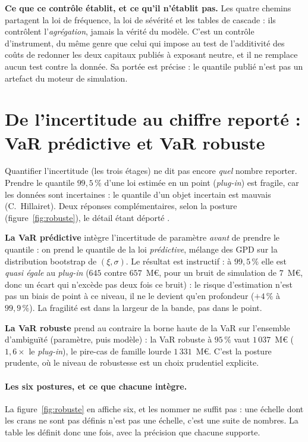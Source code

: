 \begin{cle}
\textbf{Ce que ce contrôle établit, et ce qu'il n'établit pas.} Les quatre chemins partagent la
loi de fréquence, la loi de sévérité et les tables de cascade : ils contrôlent
l'\emph{agrégation}, jamais la vérité du modèle. C'est un contrôle d'instrument, du même genre
que celui qui impose au test de l'additivité des coûts de redonner les deux capitaux publiés à
exposant neutre, et il ne remplace aucun test contre la donnée. Sa portée est précise : le
quantile publié n'est pas un artefact du moteur de simulation.
\end{cle}


\section{De l'incertitude au chiffre reporté : VaR prédictive et VaR robuste}
\label{sec:predictive-robuste}

Quantifier l'incertitude (les trois étages) ne dit pas encore \emph{quel} nombre reporter.
Prendre le quantile $99{,}5\,\%$ d'une loi estimée en un point (\emph{plug-in}) est fragile,
car les données sont incertaines : \og{}le quantile d'un objet incertain est mauvais\fg{}
(C.~Hillairet). Deux réponses complémentaires, selon la posture (figure~\ref{fig:robuste}),
le détail étant déporté \matcomp.

\textbf{La VaR prédictive} intègre l'incertitude de paramètre \emph{avant} de prendre le
quantile : on prend le quantile de la loi \emph{prédictive}, mélange des GPD sur la distribution
bootstrap de $(\xi,\sigma)$. Le résultat est instructif : à $99{,}5\,\%$ elle est \emph{quasi
égale} au \emph{plug-in} ($645$ contre $657$~M\euro, pour un bruit de simulation de $7$~M\euro,
donc un écart qui n'excède pas deux fois ce bruit) : le risque d'estimation n'est pas un
biais de point à ce niveau, il ne le devient qu'en profondeur ($+4\,\%$ à $99{,}9\,\%$). La
fragilité est dans la largeur de la bande, pas dans le point.

\textbf{La VaR robuste} prend au contraire la borne haute de la VaR sur l'ensemble
d'ambiguïté (paramètre, puis modèle) : la VaR robuste à $95\,\%$ vaut $1\,037$~M\euro{}
($1{,}6\times$ le \emph{plug-in}), le pire-cas de famille lourde $1\,331$~M\euro. C'est la
posture prudente, où le niveau de robustesse est un choix prudentiel explicite.

\paragraph{Les six postures, et ce que chacune intègre.} La figure~\ref{fig:robuste} en affiche
six, et les nommer ne suffit pas : une échelle dont les crans ne sont pas définis n'est pas une
échelle, c'est une suite de nombres. La table les définit donc une fois, avec la précision que
chacune supporte.

